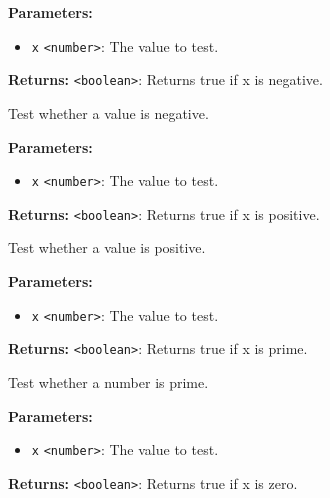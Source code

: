 \documentclass[12pt,a4paper]{article}
\begin{document}
\noindent \textbf{Parameters:}
\begin{itemize}
  \item \texttt{x} \texttt{<number>}: The value to test.
\end{itemize}

\noindent \textbf{Returns:} \texttt{<boolean>}: Returns true if x is negative.

\noindent Test whether a value is negative.

\vspace{5mm}
\noindent {}


\noindent \textbf{Parameters:}
\begin{itemize}
  \item \texttt{x} \texttt{<number>}: The value to test.
\end{itemize}

\noindent \textbf{Returns:} \texttt{<boolean>}: Returns true if x is positive.

\noindent Test whether a value is positive.

\vspace{5mm}
\noindent {}


\noindent \textbf{Parameters:}
\begin{itemize}
  \item \texttt{x} \texttt{<number>}: The value to test.
\end{itemize}

\noindent \textbf{Returns:} \texttt{<boolean>}: Returns true if x is prime.

\noindent Test whether a number is prime.

\vspace{5mm}
\noindent {}


\noindent \textbf{Parameters:}
\begin{itemize}
  \item \texttt{x} \texttt{<number>}: The value to test.
\end{itemize}

\noindent \textbf{Returns:} \texttt{<boolean>}: Returns true if x is zero.
\end{document}
